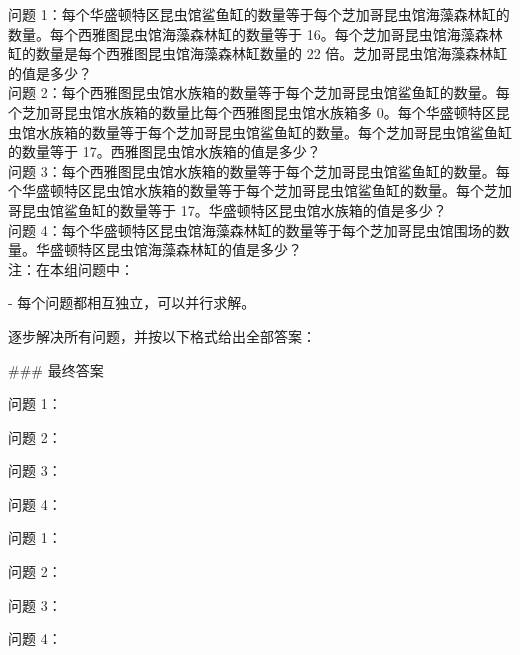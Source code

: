 \begin{systemprompt}[title={问题}]
问题 1：每个华盛顿特区昆虫馆鲨鱼缸的数量等于每个芝加哥昆虫馆海藻森林缸的数量。每个西雅图昆虫馆海藻森林缸的数量等于 16。每个芝加哥昆虫馆海藻森林缸的数量是每个西雅图昆虫馆海藻森林缸数量的 22 倍。芝加哥昆虫馆海藻森林缸的值是多少？\\

问题 2：每个西雅图昆虫馆水族箱的数量等于每个芝加哥昆虫馆鲨鱼缸的数量。每个芝加哥昆虫馆水族箱的数量比每个西雅图昆虫馆水族箱多 0。每个华盛顿特区昆虫馆水族箱的数量等于每个芝加哥昆虫馆鲨鱼缸的数量。每个芝加哥昆虫馆鲨鱼缸的数量等于 17。西雅图昆虫馆水族箱的值是多少？\\

问题 3：每个西雅图昆虫馆水族箱的数量等于每个芝加哥昆虫馆鲨鱼缸的数量。每个华盛顿特区昆虫馆水族箱的数量等于每个芝加哥昆虫馆鲨鱼缸的数量。每个芝加哥昆虫馆鲨鱼缸的数量等于 17。华盛顿特区昆虫馆水族箱的值是多少？\\

问题 4：每个华盛顿特区昆虫馆海藻森林缸的数量等于每个芝加哥昆虫馆围场的数量。华盛顿特区昆虫馆海藻森林缸的值是多少？\\

注：在本组问题中：

- 每个问题都相互独立，可以并行求解。

逐步解决所有问题，并按以下格式给出全部答案：

\#\#\# 最终答案

问题 1：\boxed{[answer1]}

问题 2：\boxed{[answer2]}

问题 3：\boxed{[answer3]}

问题 4：\boxed{[answer4]}
\end{systemprompt}




\begin{userprompt}[title={答案}]
问题 1：

问题 2：

问题 3：

问题 4：
\end{userprompt}


